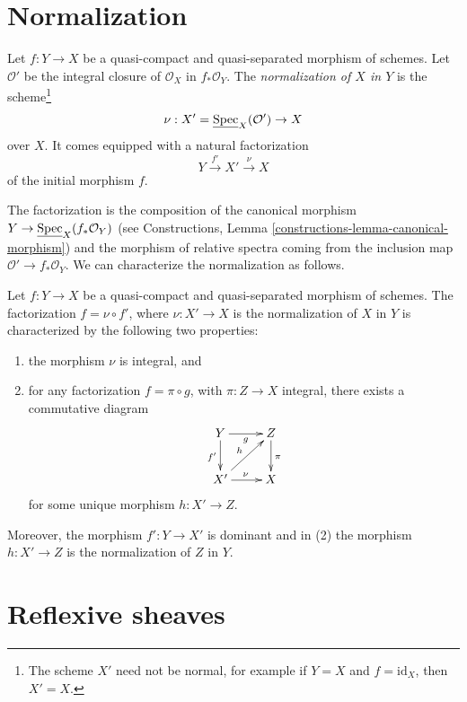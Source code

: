 \section{Normalization}
\label{section-normalization}

\begin{definition}
\label{definition-normalization-X-in-Y}
Let $f : Y \to X$ be a quasi-compact and quasi-separated morphism of schemes.
Let $\mathcal{O}'$ be the integral closure of $\mathcal{O}_X$ in
$f_*\mathcal{O}_Y$. The {\it normalization of $X$ in $Y$} is the
scheme\footnote{The scheme $X'$ need not be normal, for example if
$Y = X$ and $f = \text{id}_X$, then $X' = X$.}
$$
\nu : X' = \underline{\mathop{\mathrm{Spec}}}_X(\mathcal{O}') \to X
$$
over $X$. It comes equipped with a natural factorization
$$
Y \xrightarrow{f'} X' \xrightarrow{\nu} X
$$
of the initial morphism $f$.
\end{definition}

\noindent
The factorization is the composition of the canonical morphism
$Y \to \underline{\mathop{\mathrm{Spec}}}_X(f_*\mathcal{O}_Y)$ (see
Constructions, Lemma
\ref{constructions-lemma-canonical-morphism})
and the morphism of relative spectra coming from the inclusion map
$\mathcal{O}' \to f_*\mathcal{O}_Y$. We can characterize the
normalization as follows.

\begin{lemma}
\label{lemma-characterize-normalization}
Let $f : Y \to X$ be a quasi-compact and quasi-separated morphism of schemes.
The factorization $f = \nu \circ f'$, where $\nu : X' \to X$ is the
normalization of $X$ in $Y$ is characterized by the following
two properties:
\begin{enumerate}
\item the morphism $\nu$ is integral, and
\item for any factorization $f = \pi \circ g$, with $\pi : Z \to X$
integral, there exists a commutative diagram
$$
\xymatrix{
Y \ar[d]_{f'} \ar[r]_g & Z \ar[d]^\pi \\
X' \ar[ru]^h \ar[r]^\nu & X
}
$$
for some unique morphism $h : X' \to Z$.
\end{enumerate}
Moreover, the morphism $f' : Y \to X'$ is dominant and in (2) the
morphism $h : X' \to Z$ is the normalization of $Z$ in $Y$.
\end{lemma}



\section{Reflexive sheaves}
\label{section-reflexive-sheaves}

